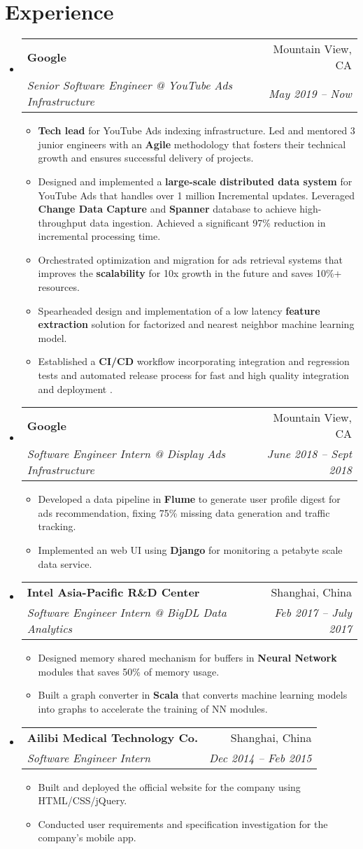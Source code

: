 \documentclass[letterpaper,11pt]{article}
\makeatletter
\newcommand{\resumeItem}[2]{
  \item\small{
    \textbf{#1}{#2 \vspace{-2pt}}
  }
}
\newcommand{\resumeSubheading}[4]{
  \vspace{-1pt}\item 
    \begin{tabular*}{0.97\textwidth}{l@{\extracolsep{\fill}}r}
      \textbf{#1} & #2 \\
      \textit{\small#3} & \textit{\small #4} \\
    \end{tabular*}\vspace{-5pt}
}
\newcommand{\resumeSubHeadingListStart}{\begin{itemize}[leftmargin=*,label={}]}
\newcommand{\resumeSubHeadingListEnd}{\end{itemize}}
\newcommand{\resumeItemListStart}{\begin{itemize}}
\newcommand{\resumeItemListEnd}{\end{itemize}\vspace{-5pt}}
\makeatother
\begin{document}
\section{Experience}
  \resumeSubHeadingListStart
    \resumeSubheading
    {Google}{Mountain View, CA}
    {Senior Software Engineer @ YouTube Ads Infrastructure}{May 2019 -- Now}
    \resumeItemListStart 
        \resumeItem{}{\textbf{Tech lead} for YouTube Ads indexing infrastructure. Led and mentored 3 junior engineers with an \textbf{Agile} methodology that fosters their technical growth and ensures successful delivery of projects.}
        \resumeItem{}{Designed and implemented a \textbf{large-scale distributed data system} for YouTube Ads that handles over 1 million Incremental updates. Leveraged \textbf{Change Data Capture} and \textbf{Spanner} database to achieve high-throughput data ingestion. Achieved a significant 97\% reduction in incremental processing time.}
        \resumeItem{}{Orchestrated optimization and migration for ads retrieval systems that improves the \textbf{scalability} for 10x growth in the future and saves 10\%+ resources.}
        \resumeItem{}{Spearheaded design and implementation of a low latency \textbf{feature extraction} solution for factorized and nearest neighbor machine learning model.}
        \resumeItem{}{Established a \textbf{CI/CD} workflow incorporating integration and regression tests and automated release process for fast and high quality integration and deployment .}
    \resumeItemListEnd

    \resumeSubheading
    {Google}{Mountain View, CA}
    {Software Engineer Intern @ Display Ads Infrastructure}{June 2018 -- Sept 2018}
    \resumeItemListStart 
        \resumeItem{}{Developed a data pipeline in \textbf{Flume} to generate user profile digest for ads recommendation, fixing 75\% missing data generation and traffic tracking.}
        \resumeItem{}{Implemented an web UI using \textbf{Django} for monitoring a petabyte scale data service.}
    \resumeItemListEnd

    \resumeSubheading
      {Intel Asia-Pacific R\&D Center}{Shanghai, China}
      {Software Engineer Intern @ BigDL Data Analytics}{Feb 2017 -- July 2017}
      \resumeItemListStart
        \resumeItem{}
          {Designed memory shared mechanism for buffers in \textbf{Neural Network} modules that saves 50\% of memory usage.}
        \resumeItem{}{Built a graph converter in \textbf{Scala} that converts machine learning models into graphs to accelerate the training of NN modules.}
      \resumeItemListEnd
          \resumeSubheading
      {Ailibi Medical Technology Co.}{Shanghai, China}
      {Software Engineer Intern}{Dec 2014 -- Feb 2015}
      \resumeItemListStart
        \resumeItem{}
          {Built and deployed the official website for the company using HTML/CSS/jQuery.}
        \resumeItem{}
          {Conducted user requirements and specification investigation for the company's mobile app.}
      \resumeItemListEnd
  \resumeSubHeadingListEnd
\end{document}

